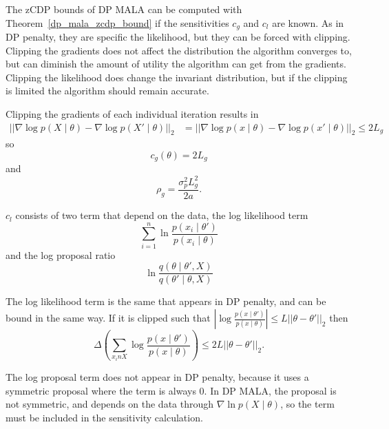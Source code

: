 \documentclass[english,twoside,openright]{HYgraduMLDS}
\begin{document}
The zCDP bounds of DP MALA can be computed with Theorem~\ref{dp_mala_zcdp_bound}
if the sensitivities \(c_g\) and \(c_l\) are known. As in DP penalty, they are 
specific the likelihood, but they can be forced with clipping. Clipping the 
gradients does not affect the distribution the algorithm converges to, but can 
diminish the amount of utility the algorithm can get from the gradients.
Clipping the likelihood does change the invariant distribution, but if the clipping 
is limited the algorithm should remain accurate.

Clipping the gradients of each individual iteration results in
\begin{align*}
    ||\nabla \log p(X\mid \theta) - \nabla \log p(X'\mid \theta)||_2
    &= ||\nabla \log p(x\mid \theta) - \nabla \log p(x'\mid \theta)||_2
    \leq 2L_g
\end{align*}
so 
\[
    c_g(\theta) = 2L_g
\]
and 
\[
    \rho_g = \frac{\sigma_p^2L_g^2}{2a}.
\]

\(c_l\) consists of two term that depend on the data, the 
log likelihood term 
\[
    \sum_{i=1}^n \ln \frac{p(x_i\mid \theta')}{p(x_i\mid \theta)}
\]
and the log proposal ratio
\[
    \ln \frac{q(\theta\mid \theta', X)}{q(\theta'\mid \theta, X)}
\]

The log likelihood term is the same that appears in DP penalty, and can be 
bound in the same way. If it is clipped such that
\(\left|\log \frac{p(x\mid \theta')}{p(x\mid \theta)}\right| \leq L||\theta - \theta'||_2\)
then
\[
    \Delta\left(\sum_{x_in X}\log \frac{p(x\mid \theta')}{p(x\mid \theta)}\right)
    \leq 2L||\theta - \theta'||_2.
\]

The log proposal term does not appear in DP penalty, because it uses a symmetric 
proposal where the term is always 0. In DP MALA, the proposal is not symmetric, 
and depends on the data through \(\nabla \ln p(X\mid \theta)\), so the term 
must be included in the sensitivity calculation.
\end{document}
